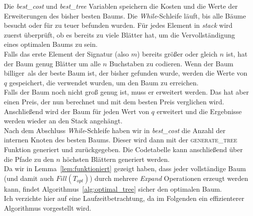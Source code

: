 \documentclass[a4paper,10pt,ngerman]{scrartcl}
\begin{document}
    Die \textit{best\_cost} und \textit{best\_tree} Variablen speichern die Kosten und die Werte der Erweiterungen des bisher besten Baums.
    Die \textit{While}-Schleife läuft, bis alle Bäume besucht oder für zu teuer befunden wurden.
    Für jedes Element in \textit{stack} wird zuerst überprüft, ob es bereits zu viele Blätter hat, um die Vervollständigung eines optimalen Baums zu sein.\\
    Falls das erste Element der Signatur (also $m$) bereits größer oder gleich $n$ ist, hat der Baum genug Blätter um alle $n$ Buchstaben zu codieren.
    Wenn der Baum \glqq billiger\grqq~als der beste Baum ist, der bisher gefunden wurde, werden die Werte von $q$ gespeichert, die verwendet wurden, um den Baum zu erreichen. \\
    Falls der Baum noch nicht groß genug ist, muss er erweitert werden.
    Das hat aber einen Preis, der nun berechnet und mit dem besten Preis verglichen wird. \\
    Anschließend wird der Baum für jeden Wert von $q$ erweitert und die Ergebnisse werden wieder an den Stack angehängt. \\
    Nach dem Abschluss \textit{While}-Schleife haben wir in \textit{best\_cost} die Anzahl der internen Knoten des besten Baums.
    Dieser wird dann mit der \textsc{generate\_tree} Funktion generiert und zurückgegeben.
    Die Codetabelle kann anschließend über die Pfade zu den $n$ höchsten Blättern generiert werden. \\
    Da wir in Lemma~\ref{lem:funktioniert} gezeigt haben, dass jeder vollständige Baum (und damit auch $Fill(T_{opt})$) durch mehrere \textit{Expand} Operationen erzeugt werden kann, findet Algorithmus~\ref{alg:optimal_tree} sicher den optimalen Baum. \\

    Ich verzichte hier auf eine Laufzeitbetrachtung, da im Folgenden ein effizienterer Algorithmus vorgestellt wird.
\end{document}
